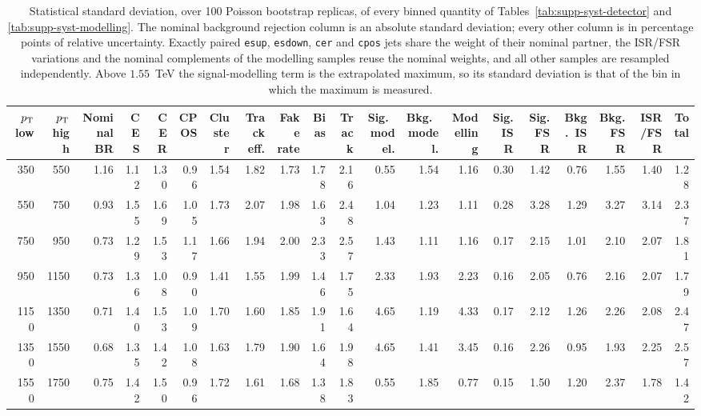 \begin{landscape}
\begin{table}[p]
\centering
\footnotesize
\setlength{\tabcolsep}{1.9pt}
\caption{Statistical standard deviation, over 100 Poisson bootstrap replicas, of every binned quantity of Tables~\ref{tab:supp-syst-detector} and \ref{tab:supp-syst-modelling}. The nominal background rejection column is an absolute standard deviation; every other column is in percentage points of relative uncertainty. Exactly paired \texttt{esup}, \texttt{esdown}, \texttt{cer} and \texttt{cpos} jets share the weight of their nominal partner, the ISR/FSR variations and the nominal complements of the modelling samples reuse the nominal weights, and all other samples are resampled independently. Above $1.55$~TeV the signal-modelling term is the extrapolated maximum, so its standard deviation is that of the bin in which the maximum is measured.}
\label{tab:supp-bootstrap-binned}
\begin{tabular}{rrrrrrrrrrrrrrrrrrrr}
\toprule
$p_{\mathrm{T}}$ low & $p_{\mathrm{T}}$ high & Nominal BR & CES & CER & CPOS & Cluster & Track eff. & Fake rate & Bias & Track & Sig.\ model. & Bkg.\ model. & Modelling & Sig.\ ISR & Sig.\ FSR & Bkg.\ ISR & Bkg.\ FSR & ISR/FSR & Total \\
\midrule
350 & 550 & 1.16 & 1.12 & 1.30 & 0.96 & 1.54 & 1.82 & 1.73 & 1.78 & 2.16 & 0.55 & 1.54 & 1.16 & 0.30 & 1.42 & 0.76 & 1.55 & 1.40 & 1.28 \\
550 & 750 & 0.93 & 1.55 & 1.69 & 1.05 & 1.73 & 2.07 & 1.98 & 1.63 & 2.48 & 1.04 & 1.23 & 1.11 & 0.28 & 3.28 & 1.29 & 3.27 & 3.14 & 2.37 \\
750 & 950 & 0.73 & 1.29 & 1.53 & 1.17 & 1.66 & 1.94 & 2.00 & 2.33 & 2.57 & 1.43 & 1.11 & 1.16 & 0.17 & 2.15 & 1.01 & 2.10 & 2.07 & 1.81 \\
950 & 1150 & 0.73 & 1.36 & 1.08 & 0.90 & 1.41 & 1.55 & 1.99 & 1.46 & 1.75 & 2.33 & 1.93 & 2.23 & 0.16 & 2.05 & 0.76 & 2.16 & 2.07 & 1.79 \\
1150 & 1350 & 0.71 & 1.40 & 1.53 & 1.09 & 1.70 & 1.60 & 1.85 & 1.91 & 1.64 & 4.65 & 1.19 & 4.33 & 0.17 & 2.12 & 1.26 & 2.26 & 2.08 & 2.47 \\
1350 & 1550 & 0.68 & 1.35 & 1.42 & 1.08 & 1.63 & 1.79 & 1.90 & 1.64 & 1.98 & 4.65 & 1.41 & 3.45 & 0.16 & 2.26 & 0.95 & 1.93 & 2.25 & 2.57 \\
1550 & 1750 & 0.75 & 1.42 & 1.50 & 0.96 & 1.72 & 1.61 & 1.68 & 1.38 & 1.83 & 0.55 & 1.85 & 0.77 & 0.15 & 1.50 & 1.20 & 2.37 & 1.78 & 1.42 \\

\end{tabular}
\end{table}
\end{landscape}
